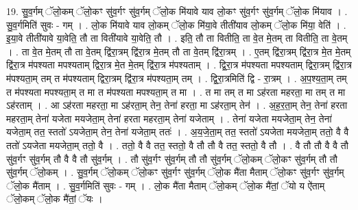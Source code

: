 \documentclass[17pt]{extarticle}
\begin{document}
19. सु॒व॒र्गम् ॅलो॒कम् ॅलो॒कꣳ सु॑व॒र्गꣳ सु॑व॒र्गम् ॅलो॒क मि॑यावे याव लो॒कꣳ सु॑व॒र्गꣳ सु॑व॒र्गम् ॅलो॒क मि॑याव । . सु॒व॒र्गमिति॑ सुवः - गम् । . लो॒क मि॑यावे याव लो॒कम् ॅलो॒क मि॑या॒वे तीती॑याव लो॒कम् ॅलो॒क मि॑या॒ वेति॑ । . इ॒या॒वे तीती॑यावे या॒वेति॒ तौ ता विती॑यावे या॒वेति॒ तौ । . इति॒ तौ ता वितीति॒ ता वे॒त मे॒तम् ता वितीति॒ ता वे॒तम् । . ता वे॒त मे॒तम् तौ ता वे॒तम् द्वि॑रा॒त्रम् द्वि॑रा॒त्र मे॒तम् तौ ता वे॒तम् द्वि॑रा॒त्रम् । . ए॒तम् द्वि॑रा॒त्रम् द्वि॑रा॒त्र मे॒त मे॒तम् द्वि॑रा॒त्र म॑पश्यता मपश्यताम् द्विरा॒त्र मे॒त मे॒तम् द्वि॑रा॒त्र म॑पश्यताम् । . द्वि॒रा॒त्र म॑पश्यता मपश्यताम् द्विरा॒त्रम् द्वि॑रा॒त्र म॑पश्यता॒म् तम् त म॑पश्यताम् द्विरा॒त्रम् द्वि॑रा॒त्र म॑पश्यता॒म् तम् । . द्वि॒रा॒त्रमिति॑ द्वि - रा॒त्रम् । . अ॒प॒श्य॒ता॒म् तम् त म॑पश्यता मपश्यता॒म् त मा त म॑पश्यता मपश्यता॒म् त मा । . त मा तम् त मा ऽह॑रता महरता॒ मा तम् त मा ऽह॑रताम् । . आ ऽह॑रता महरता॒ मा ऽह॑रता॒म् तेन॒ तेना॑ हरता॒ मा ऽह॑रता॒म् तेन॑ । . अ॒ह॒र॒ता॒म् तेन॒ तेना॑ हरता महरता॒म् तेना॑ यजेता मयजेता॒म् तेना॑ हरता महरता॒म् तेना॑ यजेताम् । . तेना॑ यजेता मयजेता॒म् तेन॒ तेना॑ यजेता॒म् तत॒ स्ततो॑ ऽयजेता॒म् तेन॒ तेना॑ यजेता॒म् ततः॑ । . अ॒य॒जे॒ता॒म् तत॒ स्ततो॑ ऽयजेता मयजेता॒म् ततो॒ वै वै ततो॑ ऽयजेता मयजेता॒म् ततो॒ वै । . ततो॒ वै वै तत॒ स्ततो॒ वै तौ तौ वै तत॒ स्ततो॒ वै तौ । . वै तौ तौ वै वै तौ सु॑व॒र्गꣳ सु॑व॒र्गम् तौ वै वै तौ सु॑व॒र्गम् । . तौ सु॑व॒र्गꣳ सु॑व॒र्गम् तौ तौ सु॑व॒र्गम् ॅलो॒कम् ॅलो॒कꣳ सु॑व॒र्गम् तौ तौ सु॑व॒र्गम् ॅलो॒कम् । . सु॒व॒र्गम् ॅलो॒कम् ॅलो॒कꣳ सु॑व॒र्गꣳ सु॑व॒र्गम् ॅलो॒क मै॑ता मैताम् ॅलो॒कꣳ सु॑व॒र्गꣳ सु॑व॒र्गम् ॅलो॒क मै॑ताम् । . सु॒व॒र्गमिति॑ सुवः - गम् । . लो॒क मै॑ता मैताम् ॅलो॒कम् ॅलो॒क मै॑तां॒ ॅयो य ऐ॑ताम् ॅलो॒कम् ॅलो॒क मै॑तां॒ ॅयः । \newline
\end{document}
